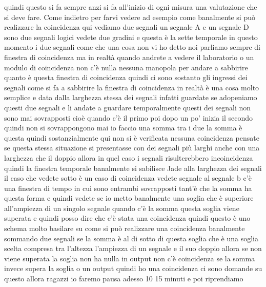 quindi questo si fa sempre anzi si fa all'inizio di ogni misura una valutazione che si deve fare. Come indietro per farvi vedere ad esempio come banalmente si può realizzare la coincidenza qui vediamo due segnali un segnale A e un segnale D sono due segnali logici vedete due gradini e questa è la sette temporale in questo momento i due segnali come che una cosa non vi ho detto noi parliamo sempre di finestra di coincidenza ma in realtà quando andrete a vedere il laboratorio o un modulo di coincidenza non c'è nulla nessuna manopola per andare a sabbirire quanto è questa finestra di coincidenza quindi ci sono sostanto gli ingressi dei segnali come si fa a sabbirire la finestra di coincidenza in realtà è una cosa molto semplice e data dalla larghezza stessa dei segnali infatti guardate se adopeniamo questi due segnali e li andate a guardare temporalmente questi dei segnali non sono mai sovrapposti cioè quando c'è il primo poi dopo un po' inizia il secondo quindi non si sovrappongono mai io faccio una somma tra i due la somma è questa quindi sostanzialmente qui non si è verificata nessuna coincidenza pensate se questa stessa situazione si presentasse con dei segnali più larghi anche con una larghezza che il doppio allora in quel caso i segnali risulterebbero incoincidenza quindi la finestra temporale banalmente si sabilisce Jade alla larghezza dei segnali il caso che vedete sotto è un caso di coincidenza vedete segnale al segnale b c'è una finestra di tempo in cui sono entrambi sovrapposti tant'è che la somma ha questa forma e quindi vedete se io metto banalmente una soglia che è superiore all'ampiezza di un singolo segnale quando c'è la somma questa soglia viene superata e quindi posso dire che c'è stata una coincidenza quindi questo è uno schema molto basilare su come si può realizzare una coincidenza banalmente sommando due segnali se la somma è al di sotto di questa soglia che è una soglia scelta compresa tra l'altezza l'ampiezza di un segnale e il suo doppio allora se non viene superata la soglia non ha nulla in output non c'è coincidenza se la somma invece supera la soglia o un output quindi ho una coincidenza ci sono domande su questo allora ragazzi io faremo pausa adesso 10 15 minuti e poi riprendiamo

